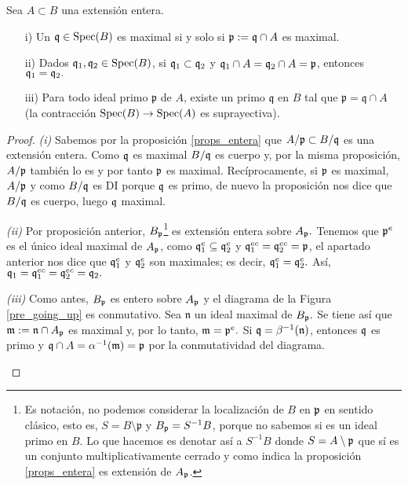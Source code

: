 \documentclass[../main.tex]{subfiles}
\begin{document}
\begin{proposition}\label{prop:lying} Sea $A\subset B$ una extensión entera.
\begin{itemize}
    \item[i)] Un $\mathfrak{q}\in\text{Spec}(B)$ es maximal si y solo si $\mathfrak{p}:=\mathfrak{q}\cap A$  es maximal.
    \item[ii)] Dados $\mathfrak{q}_1,\mathfrak{q}_2\in\text{Spec}(B)$, si $\mathfrak{q}_1\subset\mathfrak{q}_2$ y $\mathfrak{q}_1\cap A=\mathfrak{q}_2\cap A=\mathfrak{p}$, entonces $\mathfrak{q}_1=\mathfrak{q}_2.$
    \item[iii)] Para todo ideal primo $\mathfrak{p}$ de $A$, existe un primo $\mathfrak{q}$ en $B$ tal que $\mathfrak{p} = \mathfrak{q} \cap A$ (la contracción $\text{Spec}(B)\rightarrow\text{Spec}(A)$ es suprayectiva).
\end{itemize}
\end{proposition}

\begin{proof}
\textit{(i)} Sabemos por la proposición \ref{props_entera} que $A/\mathfrak{p} \subset B/\mathfrak{q}$ es una extensión entera. Como $\mathfrak{q}$ es maximal $B/\mathfrak{q}$ es cuerpo y, por la misma proposición, $A/\mathfrak{p}$ también lo es y por tanto $\mathfrak{p}$ es maximal. Recíprocamente, si $\mathfrak{p}$ es maximal, $A/\mathfrak{p}$ y como $B/\mathfrak{q}$ es DI porque $\mathfrak{q}$ es primo, de nuevo la proposición nos dice que $B/\mathfrak{q}$ es cuerpo, luego $\mathfrak{q}$ maximal.

\textit{(ii)} Por proposición anterior, $B_{\mathfrak{p}}$\footnote{Es notación, no podemos considerar la localización de $B$ en $\mathfrak{p}$ en sentido clásico, esto es, $S = B \setminus \mathfrak{p}$ y $B_{\mathfrak{p}} = S^{-1}B$, porque no sabemos si es un ideal primo en $B$. Lo que hacemos es denotar así a $S^{-1}B$ donde $S= A\setminus \mathfrak{p}$ que sí es un conjunto multiplicativamente cerrado y como indica la proposición \ref{props_entera} es extensión de $A_{\mathfrak{p}}$.} es extensión entera sobre $A_{\mathfrak{p}}.$ Tenemos que $\mathfrak{p}^e$ es el único ideal maximal de $A_{\mathfrak{p}}$, como $\mathfrak{q}_1^e\subseteq \mathfrak{q}_2^e$ y $\mathfrak{q}_1^{ec}= \mathfrak{q}_2^{ec}=\mathfrak{p}$, el apartado anterior nos dice que $\mathfrak{q}_1^e$ y $\mathfrak{q}_2^e$ son maximales; es decir, $\mathfrak{q}_1^e=\mathfrak{q}_2^e.$ Así, $\mathfrak{q}_1=\mathfrak{q}_1^{ec}=\mathfrak{q}_2^{ec}=\mathfrak{q}_2.$

\textit{(iii)} Como antes, $B_{\mathfrak{p}}$ es entero sobre $A_{\mathfrak{p}}$ y el diagrama de la Figura \ref{pre_going_up} es conmutativo. Sea $\mathfrak{n}$ un ideal maximal de $B_{\mathfrak{p}}.$
Se tiene así que $\mathfrak{m}:=\mathfrak{n}\cap A_{\mathfrak{p}}$ es maximal y, por lo tanto, $\mathfrak{m}=\mathfrak{p}^e.$ Si $\mathfrak{q}=\beta^{-1}(\mathfrak{n})$, entonces $\mathfrak{q}$ es primo y $\mathfrak{q}\cap A=\alpha^{-1}(\mathfrak{m})=\mathfrak{p}$ por la conmutatividad del diagrama.

\begin{figure}
  \centering



\end{figure}
\end{proof}
\end{document}
